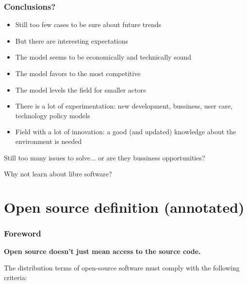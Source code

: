\begin{frame}
\frametitle{Conclusions?}

\begin{itemize}
\item Still too few cases to be sure about future trends
\item But there are interesting expectations
\item The model seems to be economically and technically sound
\item The model favors to the most competitive
\item The model levels the field for smaller actors
\item There is a lot of experimentation: new development, bussiness,
  user care, technology policy models
\item Field with a lot of innovation: a good (and updated) knowledge
  about the environment is needed
\end{itemize}

Still too many issues to solve... or are they bussiness opportunities?
\end{frame}



\begin{frame}

\begin{center}
{\LARGE
Why not learn about libre software?
}
\end{center}


\end{frame}


\section{Open source definition (annotated)}


\begin{frame}
\frametitle{Foreword}

{\bf Open source doesn't just mean access to the source code.

The distribution terms of open-source software must comply with the
following criteria:}

\vspace{.2cm}
\begin{flushright}
\end{flushright}

\end{frame}

